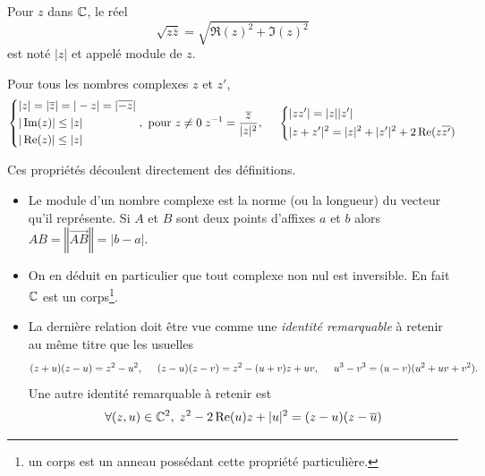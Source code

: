 \begin{defi}
 Pour $z$ dans $\C$, le réel 
\begin{displaymath}
\sqrt{z\overline{z}}=\sqrt{\Re(z)^2+\Im(z)^2} 
\end{displaymath}
 est noté $|z|$ et appelé module de $z$.
\end{defi}
\begin{prop} Pour tous les nombres complexes $z$ et $z'$,
\[
\left\lbrace 
\begin{aligned}
 &|z|=|\overline{z}|=|-z|=|\overline{-z}|\\ &|\Im(z)|\leq |z| \\ &|\Re(z)|\leq |z|
\end{aligned}
\right. ,
\text{ pour } z\neq 0\;  z^{-1}=\frac{\overline{z}}{|z|^2},
\hspace{0.5cm}
\left\lbrace 
 \begin{aligned}
  &|zz'|=|z||z'| \\ &|z+z'|^2 =|z|^2+|z'|^2+2\Re(z\overline{z'})
 \end{aligned}
\right. 
 \]
\begin{demo}
  Ces propriétés découlent directement des définitions.
\end{demo}

\begin{rems}
\begin{itemize}
 \item Le module d'un nombre complexe est la norme (ou la longueur) du vecteur qu'il représente. Si $A$ et $B$ sont deux points d'affixes $a$ et $b$ alors $AB = \left\Vert \overrightarrow{AB} \right\Vert = |b-a|$.
 \item On en déduit en particulier que tout complexe non nul est inversible. En fait $\C$ est un corps\footnote{un corps est un anneau possédant cette propriété particulière.}.
 \item La dernière relation doit être vue comme une \emph{identité remarquable} à retenir au même titre que les usuelles
\[
 (z+u)(z-u) = z^2 - u^2, \hspace{0.5cm} (z - u)(z - v) = z^2 - (u+v)z + uv, \hspace{0.5cm} u^3 - v^3 = (u-v)(u^2 + uv +v^2). 
\]
 Une autre identité remarquable à retenir est
\begin{displaymath}
 \forall (z,u)\in \C^2, \; z^2 -2\Re(u)z + |u|^2 = (z-u)(z-\overline{u})
\end{displaymath}


\end{itemize}
\end{rems}
\end{prop}
